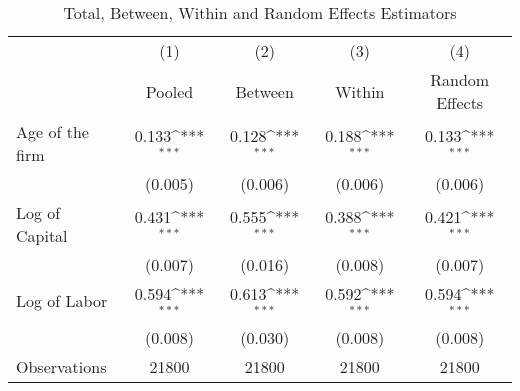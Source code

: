 \begin{table}[htbp]\centering
\def\sym#1{\ifmmode^{#1}\else\(^{#1}\)\fi}
\caption{Total, Between, Within and Random Effects Estimators \label{tab:q2}}
\begin{tabular}{l*{4}{c}}
\toprule
                    &\multicolumn{1}{c}{(1)}&\multicolumn{1}{c}{(2)}&\multicolumn{1}{c}{(3)}&\multicolumn{1}{c}{(4)}\\
                    &\multicolumn{1}{c}{Pooled}&\multicolumn{1}{c}{Between}&\multicolumn{1}{c}{Within}&\multicolumn{1}{c}{Random Effects}\\
\midrule
Age of the firm     &       0.133\sym{***}&       0.128\sym{***}&       0.188\sym{***}&       0.133\sym{***}\\
                    &     (0.005)         &     (0.006)         &     (0.006)         &     (0.006)         \\
\addlinespace
Log of Capital      &       0.431\sym{***}&       0.555\sym{***}&       0.388\sym{***}&       0.421\sym{***}\\
                    &     (0.007)         &     (0.016)         &     (0.008)         &     (0.007)         \\
\addlinespace
Log of Labor        &       0.594\sym{***}&       0.613\sym{***}&       0.592\sym{***}&       0.594\sym{***}\\
                    &     (0.008)         &     (0.030)         &     (0.008)         &     (0.008)         \\
\midrule
Observations        &       21800         &       21800         &       21800         &       21800         \\
\bottomrule
\end{tabular}
\end{table}
